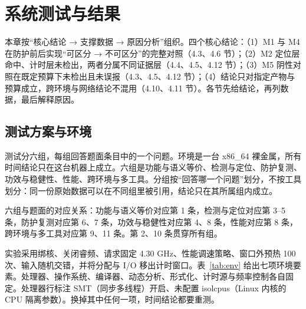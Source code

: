 
\section{系统测试与结果}

本章按“核心结论 → 支撑数据 → 原因分析”组织。四个核心结论：（1）M1 与 M4 在防护前后实现“可区分 → 不可区分”的完整对照（4.3、4.6 节）；（2）M2 定位层命中、计时层未检出，两者分属不同证据层（4.4、4.5、4.12 节）；（3）M5 阴性对照在既定预算下未检出且未误报（4.3、4.5、4.12 节）；（4）结论只对指定产物与预算成立，跨环境与网络结论不混用（4.10、4.11 节）。各节先给结论，再列数据，最后解释原因。

\subsection{测试方案与环境}

测试分六组，每组回答题面条目中的一个问题。环境是一台 x86\_64 裸金属，所有时间结论只在这台机器上成立。六组是功能与语义等价、检测与定位、防护复测、功效与稳健性、性能、跨环境与多工具。分组按“回答哪一个问题”划分，不按工具划分：同一份原始数据可以在不同组里被引用，结论只在其所属组内成立。

六组与题面的对应关系：功能与语义等价对应第 1 条，检测与定位对应第 3--5 条，防护复测对应第 6、7 条，功效与稳健性对应第 4、8 条，性能对应第 8 条，跨环境与多工具对应第 9、11 条。第 2、10 条贯穿所有组。

实验采用绑核、关闭睿频、请求固定 4.30 GHz、性能调速策略、窗口外预热 100 次、输入随机交错，并将分配与 I/O 移出计时窗口。表~\ref{tab:env} 给出七项环境要素。处理器、操作系统、编译器、动态分析、形式化、计时源与频率控制各自固定。处理器行标注 SMT（同步多线程）开启、未配置 isolcpus（Linux 内核的 CPU 隔离参数）。换掉其中任何一项，时间结论都要重测。%

